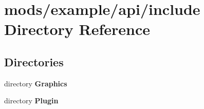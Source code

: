 \section{mods/example/api/include Directory Reference}
\label{dir_1f9e5cfa925a911501d6be4a111c6da6}
\subsection*{Directories}
\begin{DoxyCompactItemize}
\item 
directory {\bf Graphics}
\item 
directory {\bf Plugin}
\end{DoxyCompactItemize}
